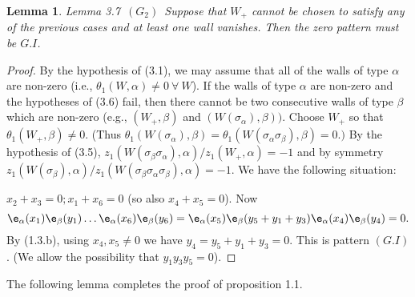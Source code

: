\documentclass{memo-l}
\newtheorem{lemma}[theorem]{Lemma}
\theoremstyle{definition}
\theoremstyle{remark}
\numberwithin{section}{chapter}
\numberwithin{equation}{chapter}
\begin{document}
{\medskip}

\begin{lemma}{Lemma 3.7}\  $(G_{2})$\  Suppose that $W_{+}$ cannot be chosen to satisfy 
any of the previous cases and at least one wall vanishes. 
 Then the zero pattern must be $G.I$.
\end{lemma}

\medskip

\begin{proof}    By the hypothesis of (3.1), we may assume that all of the 
walls of type ${\alpha}$ are non-zero (i.e., 
${\theta}_{1}(W,{\alpha})\ne 0 {\ \forall\ } W$). 
 If the walls of type ${\alpha}$ are non-zero and the hypotheses of (3.6) 
fail, then there cannot be two consecutive walls of type ${\beta}$ which are 
non-zero (e.g., $(W_{+},{\beta})$ and $(W({\sigma}_{\alpha}),{\beta}))$. 
 Choose $W_{+}$ so that ${\theta}_{1}(W_{+},{\beta})\ne 0$. 
 (Thus ${\theta}_{1}(W({\sigma}_{\alpha}),{\beta}) = 
{\theta}_{1}(W({\sigma}_{\alpha}{\sigma}_{\beta}),{\beta}) = 0.)$  By the 
hypothesis of (3.5), $z_{1}(W({\sigma}_{\beta}{\sigma}_{\alpha}),
{\alpha})/z_{1}(W_{+},{\alpha}) = -1$ and by symmetry 
$z_{1}(W({\sigma}_{\beta}),{\alpha})/z_{1}
(W({\sigma}_{\beta}{\sigma}_{\alpha}{\sigma}_{\beta}),{\alpha}) = -1$. 
 We have the following situation:

\medskip
\medskip

\noindent
$x_{2}+x_{3} = 0; x_{1}+x_{6} = 0$ (so also $x_{4}+x_{5} = 0$). 
 Now
$$
{\e}_{\alpha}(x_{1}){\e}_{\beta}(y_{1})\ldots 
{\e}_{\alpha}(x_{6}){\e}_{\beta}(y_6) = 
{\e}_{\alpha}(x_{5}){\e}_{\beta}(y_{5}+y_{1}+y_{3})
{\e}_{\alpha}(x_{4}){\e}_{\beta}(y_{4}) = 0 .
$$
By (1.3.b), using $x_{4},x_{5}\ne 0$ we have $y_{4} = y_{5}+y_{1}+y_{3} = 0$. 
 This is pattern $(G.I)$. 
 (We allow the possibility that $y_{1}y_{3}y_{5} = 0$).
\end{proof} 

{\medskip}

The following lemma completes the proof of proposition 1.1.
\end{document}
